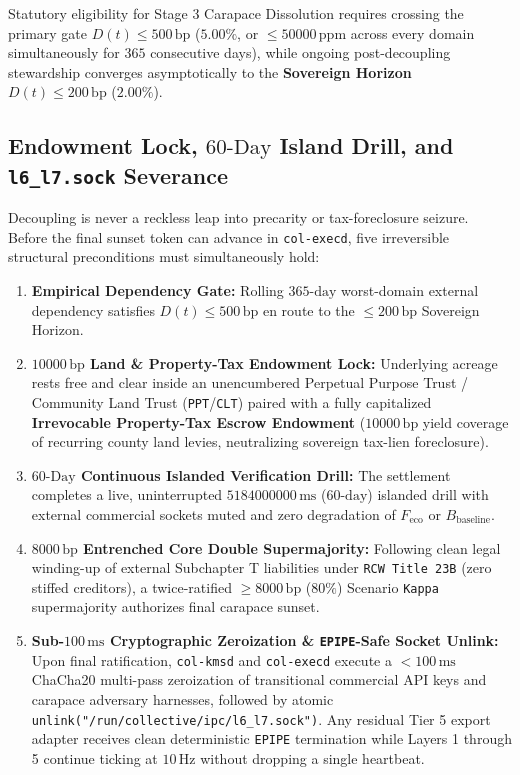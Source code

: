 Statutory eligibility for Stage 3 Carapace Dissolution requires crossing the primary gate $D(t) \le 500\,\mathrm{bp}$ ($5.00\%$, or
$\le 50000\,\mathrm{ppm}$ across every domain simultaneously for $365$ consecutive days), while ongoing post-decoupling stewardship converges
asymptotically to the \textbf{Sovereign Horizon} $D(t) \le 200\,\mathrm{bp}$ ($2.00\%$).

\subsection{Endowment Lock, $60\text{-Day}$ Island Drill, and \texttt{l6\_l7.sock} Severance}

Decoupling is never a reckless leap into precarity or tax-foreclosure seizure. Before the final sunset token can advance in \texttt{col-execd}, five
irreversible structural preconditions must simultaneously hold:
\begin{enumerate}
    \item \textbf{Empirical Dependency Gate:} Rolling $365\text{-day}$ worst-domain external dependency satisfies $D(t) \le 500\,\mathrm{bp}$ en route
    to the $\le 200\,\mathrm{bp}$ Sovereign Horizon.
    \item \textbf{$10000\,\mathrm{bp}$ Land \& Property-Tax Endowment Lock:} Underlying acreage rests free and clear inside an unencumbered Perpetual
    Purpose Trust / Community Land Trust (\texttt{PPT}/\texttt{CLT}) paired with a fully capitalized \textbf{Irrevocable Property-Tax Escrow Endowment}
    ($10000\,\mathrm{bp}$ yield coverage of recurring county land levies, neutralizing sovereign tax-lien foreclosure).
    \item \textbf{$60\text{-Day}$ Continuous Islanded Verification Drill:} The settlement completes a live, uninterrupted $5184000000\,\mathrm{ms}$
    ($60\text{-day}$) islanded drill with external commercial sockets muted and zero degradation of $F_{\mathrm{eco}}$ or $B_{\mathrm{baseline}}$.
    \item \textbf{$8000\,\mathrm{bp}$ Entrenched Core Double Supermajority:} Following clean legal winding-up of external Subchapter T liabilities under
    \texttt{RCW Title 23B} (zero stiffed creditors), a twice-ratified $\ge 8000\,\mathrm{bp}$ ($80\%$) Scenario \texttt{Kappa} supermajority authorizes
    final carapace sunset.
    \item \textbf{Sub-$100\,\mathrm{ms}$ Cryptographic Zeroization \& \texttt{EPIPE}-Safe Socket Unlink:} Upon final ratification, \texttt{col-kmsd} and
    \texttt{col-execd} execute a $< 100\,\mathrm{ms}$ ChaCha20 multi-pass zeroization of transitional commercial API keys and carapace adversary
    harnesses, followed by atomic \texttt{unlink("/run/collective/ipc/l6\_l7.sock")}. Any residual Tier 5 export adapter receives clean deterministic
    \texttt{EPIPE} termination while Layers 1 through 5 continue ticking at $10\,\mathrm{Hz}$ without dropping a single heartbeat.
\end{enumerate}

